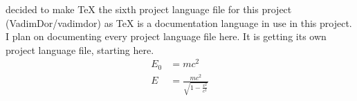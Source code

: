 \documentclass{article} %
\title{\ProjectLanguageFileSix} %
\begin{document}
  \maketitle
  \I decided to make TeX the sixth project language file for this project (VadimDor/vadimdor) as TeX is a documentation language in use in this project. I plan on documenting every project language file here. It is getting its own project language file, starting here.
  \begin{align}
    E_0 &= mc^2 \\
    E &= \frac{mc^2}{\sqrt{1-\frac{v^2}{c^2}}}
  \end{align} 
\end{document}

